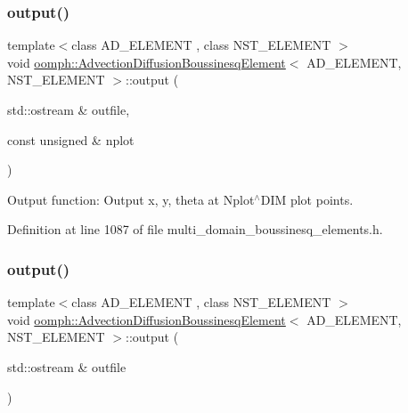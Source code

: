 \subsubsection{\texorpdfstring{output()}{output()}\hspace{0.1cm}{\footnotesize\ttfamily [1/4]}}
{\footnotesize\ttfamily template$<$class A\+D\+\_\+\+E\+L\+E\+M\+E\+NT , class N\+S\+T\+\_\+\+E\+L\+E\+M\+E\+NT $>$ \\
void \hyperlink{classoomph_1_1AdvectionDiffusionBoussinesqElement}{oomph\+::\+Advection\+Diffusion\+Boussinesq\+Element}$<$ A\+D\+\_\+\+E\+L\+E\+M\+E\+NT, N\+S\+T\+\_\+\+E\+L\+E\+M\+E\+NT $>$\+::output (\begin{DoxyParamCaption}\item[{std\+::ostream \&}]{outfile,  }\item[{const unsigned \&}]{nplot }\end{DoxyParamCaption})\hspace{0.3cm}{\ttfamily [inline]}}



Output function\+: Output x, y, theta at Nplot$^\wedge$\+D\+IM plot points. 



Definition at line 1087 of file multi\+\_\+domain\+\_\+boussinesq\+\_\+elements.\+h.

\mbox{\label{classoomph_1_1AdvectionDiffusionBoussinesqElement_acc615c265bef2c3f5c30c6be95c0f50d}} 
\subsubsection{\texorpdfstring{output()}{output()}\hspace{0.1cm}{\footnotesize\ttfamily [2/4]}}
{\footnotesize\ttfamily template$<$class A\+D\+\_\+\+E\+L\+E\+M\+E\+NT , class N\+S\+T\+\_\+\+E\+L\+E\+M\+E\+NT $>$ \\
void \hyperlink{classoomph_1_1AdvectionDiffusionBoussinesqElement}{oomph\+::\+Advection\+Diffusion\+Boussinesq\+Element}$<$ A\+D\+\_\+\+E\+L\+E\+M\+E\+NT, N\+S\+T\+\_\+\+E\+L\+E\+M\+E\+NT $>$\+::output (\begin{DoxyParamCaption}\item[{std\+::ostream \&}]{outfile }\end{DoxyParamCaption})\hspace{0.3cm}{\ttfamily [inline]}}



